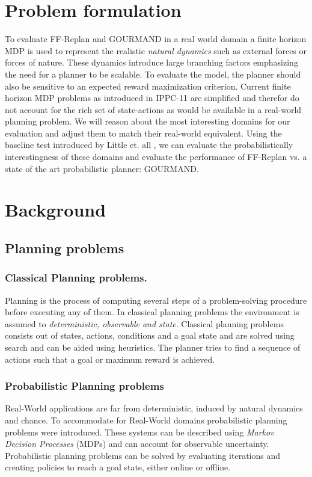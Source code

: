 \documentclass[runningheads,a4paper]{llncs}
\begin{document}

\section{Problem formulation}
To evaluate FF-Replan and GOURMAND in a real world domain a finite horizon MDP is used to represent the realistic \emph{natural dynamics} such as external forces or forces of nature. These dynamics introduce large branching factors emphasizing the need for a planner to be scalable. To evaluate the model, the planner should also be sensitive to an expected reward maximization criterion.
Current finite horizon MDP problems as introduced in IPPC-11 are simplified and therefor do not account for the rich set of state-actions as would be available in a real-world planning problem. We will reason about the most interesting domains for our evaluation and adjust them to match their real-world equivalent. Using the baseline test introduced by Little et. all \cite{little2007probvsreplan}, we can evaluate the probabilistically interestingness of these domains and evaluate the performance of FF-Replan vs. a state of the art probabilistic planner: GOURMAND.




\section{Background}

\subsection{Planning problems}
\subsubsection{Classical Planning problems. } Planning is the process of computing several steps of a problem-solving procedure before executing any of them. In classical planning problems the environment is assumed to \emph{deterministic, observable and state}. Classical planning problems consists out of states, actions, conditions and a goal state and are solved using search and can be aided using heuristics. The planner tries to find a sequence of actions such that a goal or maximum reward is achieved.

\subsubsection{Probabilistic Planning problems}
Real-World applications are far from deterministic, induced by natural dynamics and chance. To accommodate for Real-World domains probabilistic planning problems were introduced.  These systems can be described using \emph{Markov Decision Processes} (MDPs) and can account for observable uncertainty. Probabilistic planning problems can be solved by evaluating iterations and creating policies to reach a goal state, either online or offline.
\end{document}
